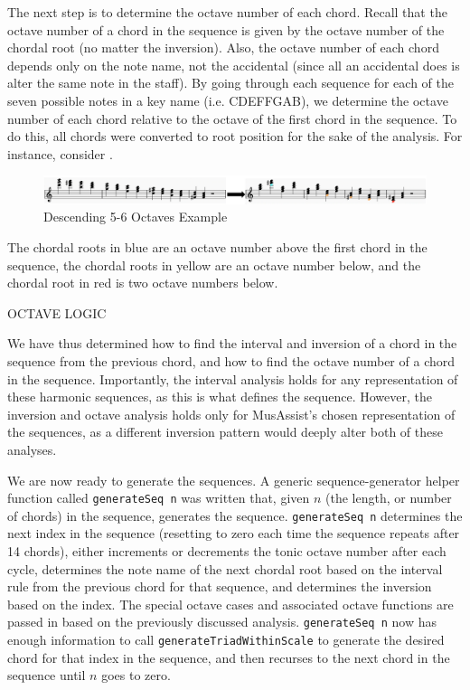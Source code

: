 \documentclass{article}
\begin{document}
The next step is to determine the octave number of each chord. Recall that the octave number of a chord in the sequence is given by the octave number of the chordal root (no matter the inversion). Also, the octave number of each chord depends only on the note name, not the accidental (since all an accidental does is alter the same note in the staff). By going through each sequence for each of the seven possible notes in a key name (i.e. CDEFFGAB), we determine the octave number of each chord relative to the octave of the first chord in the sequence. To do this, all chords were converted to root position for the sake of the analysis. For instance, consider . 

\begin{figure}[h!]
\centering
\includegraphics[width=1.1\textwidth]{images/desc56-example}
  \caption{Descending 5-6 Octaves Example}
  \label{fig:desc56-example}
\end{figure}

The chordal roots in blue are an octave number above the first chord in the sequence,  the chordal roots in yellow are an octave number below, and the chordal  root in red is two octave numbers below.

OCTAVE LOGIC

We have thus determined how to find the interval and inversion of a chord in the sequence from the previous chord, and how to find the octave number of a chord in the sequence. Importantly, the interval analysis holds for any representation of these harmonic sequences, as this is what defines the sequence. However, the inversion and octave analysis holds only for MusAssist's chosen representation of the sequences, as a different inversion pattern would deeply alter both of these analyses.

We are now ready to generate the sequences. A generic sequence-generator helper function called \verb.generateSeq n. was written that, given $n$ (the length, or number of chords) in the sequence, generates the sequence. \verb.generateSeq n. determines the next index  in the sequence (resetting to zero each  time the sequence repeats after 14 chords), either  increments or decrements the tonic octave number after each cycle, determines the note name of the next chordal root based on the interval rule from the previous chord for that sequence, and determines the inversion based on the index. The special octave cases and associated octave functions are passed in based on the previously discussed analysis. \verb.generateSeq n. now has enough information to call  \verb.generateTriadWithinScale. to generate the desired chord for that index in the sequence, and then recurses to the next chord in the sequence until $n$ goes to zero. 
\end{document}
